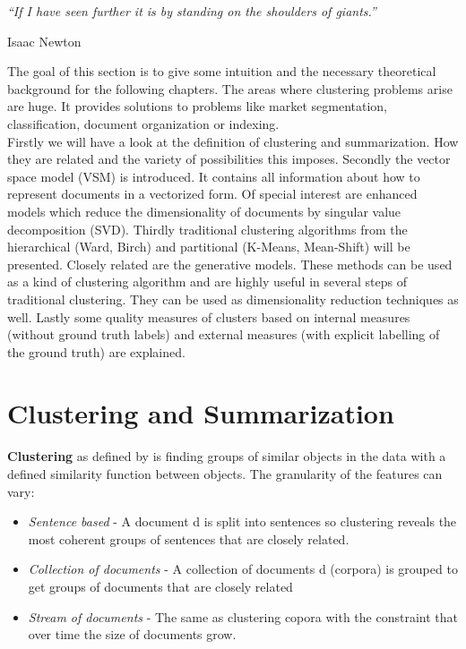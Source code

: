 \epigraph{\emph{
  ``If I have seen further it is by standing on the shoulders of giants.''
}}{ Isaac Newton }

The goal of this section is to give some intuition and the necessary theoretical background for the following chapters. The areas where clustering problems arise are huge. It provides solutions to problems like market segmentation, classification, document organization or indexing.\\
Firstly we will have a look at the definition of clustering and summarization. How they are related and the variety of possibilities this imposes.
Secondly the vector space model (VSM) is introduced. It contains all information about how to represent documents in a vectorized form. Of special interest are enhanced models which reduce the dimensionality of documents by singular value decomposition (SVD).
Thirdly traditional clustering algorithms from the hierarchical (Ward, Birch) and partitional (K-Means, Mean-Shift) will be presented.
Closely related are the generative models. These methods can be used as a kind of clustering algorithm and are highly useful in several steps of traditional clustering. They can be used as dimensionality reduction techniques as well.
Lastly some quality measures of clusters based on internal measures (without ground truth labels) and external measures (with explicit labelling of the ground truth) are explained.


\section{Clustering and Summarization}
  
  \textbf{Clustering} as defined by \cite{ClusterAlgoSurveyIBM} is finding groups of similar objects in the data with a defined similarity function between objects. The granularity of the features can vary:

  \begin{itemize}
    \item \emph{Sentence based} - A document d is split into sentences so clustering reveals the most coherent groups of sentences that are closely related.
    \item \emph{Collection of documents} - A collection of documents d (corpora) is grouped to get groups of documents that are closely related
    \item \emph{Stream of documents} - The same as clustering copora with the constraint that over time the size of documents grow.
  \end{itemize}

